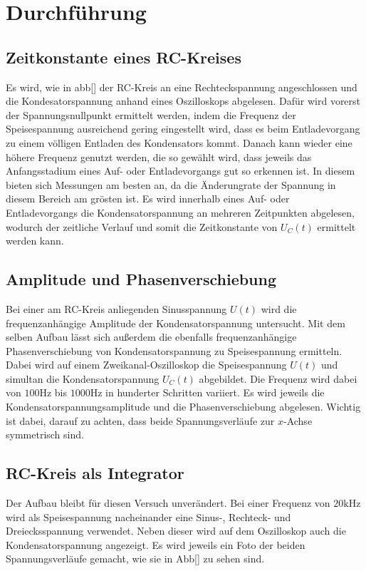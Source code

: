 \section{Durchführung}
\label{sec:Durchführung}

\subsection{Zeitkonstante eines RC-Kreises}
Es wird, wie in abb[] der RC-Kreis an eine Rechteckspannung angeschlossen und die Kondesatorspannung 
anhand eines Oszilloskops abgelesen. Dafür wird vorerst der Spannungsnullpunkt ermittelt werden, indem die Frequenz der 
Speisespannung ausreichend gering eingestellt wird, dass es beim Entladevorgang zu einem völligen Entladen des Kondensators kommt. 
Danach kann wieder eine höhere Frequenz genutzt werden, die so gewählt wird, dass jeweils das Anfangsstadium eines Auf- oder 
Entladevorgangs gut so erkennen ist. In diesem bieten sich Messungen am besten an, da die Änderungrate der Spannung in diesem 
Bereich am grösten ist.
Es wird innerhalb eines Auf- oder Entladevorgangs die Kondensatorspannung an mehreren Zeitpunkten abgelesen, wodurch der zeitliche 
Verlauf und somit die Zeitkonstante von $U_C (t)$ ermittelt werden kann.

\subsection{Amplitude und Phasenverschiebung}
Bei einer am RC-Kreis anliegenden Sinusspannung $U(t)$ wird die frequenzanhängige Amplitude der Kondensatorspannung untersucht.
Mit dem selben Aufbau lässt sich außerdem die ebenfalls frequenzanhängige
Phasenverschiebung von Kondensatorspannung zu Speisespannung ermitteln.
Dabei wird auf einem Zweikanal-Oszilloskop die Speisespannung $U(t)$ und simultan die Kondensatorspannung $U_C (t)$ abgebildet.
Die Frequenz wird dabei von $100\si{\hertz}$ bis $1000\si{\hertz}$ in hunderter Schritten variiert. Es wird jeweils die 
Kondensatorspannungsamplitude und die Phasenverschiebung abgelesen. Wichtig ist dabei, darauf zu achten, dass beide Spannungsverläufe
zur $x$-Achse symmetrisch sind. 

\subsection{RC-Kreis als Integrator}
Der Aufbau bleibt für diesen Versuch unverändert.
Bei einer Frequenz von $20\si{\kilo\hertz}$ wird als Speisespannung nacheinander eine Sinus-, Rechteck- und Dreiecksspannung
verwendet. Neben dieser wird auf dem Oszilloskop auch die Kondensatorspannung angezeigt. Es wird jeweils ein Foto der beiden 
Spannungsverläufe gemacht, wie sie in Abb[] zu sehen sind. 

